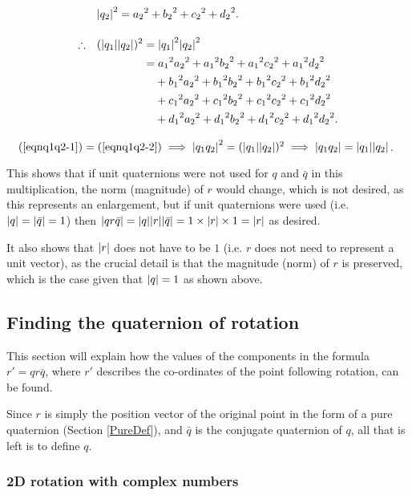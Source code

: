 \documentclass[10pt]{article}
\begin{document}
\begin{alignat}{2}
    & \abs{q_2}^2 = {a_2}^2 + {b_2}^2 + {c_2}^2 + {d_2}^2. \nonumber \\[10pt]
    \therefore \quad & (\abs{q_1}\abs{q_2})^2 = \abs{q_1}^2\abs{q_2}^2 \nonumber \\
             & \phantom{(\abs{q_1}\abs{q_2})^2} = {a_1}^2{a_2}^2 + {a_1}^2{b_2}^2 + {a_1}^2{c_2}^2 + {a_1}^2{d_2}^2 \label{eqnq1q2-2} \\
             & \phantom{(\abs{q_1}\abs{q_2})^2=} + {b_1}^2{a_2}^2 + {b_1}^2{b_2}^2 + {b_1}^2{c_2}^2 + {b_1}^2{d_2}^2 \nonumber \\
             & \phantom{(\abs{q_1}\abs{q_2})^2=} + {c_1}^2{a_2}^2 + {c_1}^2{b_2}^2 + {c_1}^2{c_2}^2 + {c_1}^2{d_2}^2 \nonumber \\
             & \phantom{(\abs{q_1}\abs{q_2})^2=} + {d_1}^2{a_2}^2 + {d_1}^2{b_2}^2 + {d_1}^2{c_2}^2 + {d_1}^2{d_2}^2. \nonumber
\end{alignat}
\endgroup

$\quad (\ref{eqnq1q2-1}) = (\ref{eqnq1q2-2}) \implies \abs{q_1q_2}^2 = (\abs{q_1}\abs{q_2})^2 \implies \abs{q_1q_2} = \abs{q_1}\abs{q_2}$.

This shows that if unit quaternions were not used for $q$ and $\bar{q}$ in this multiplication, the norm (magnitude) of $r$ would change, which is not desired, as this represents an enlargement, but if unit quaternions were used (i.e. $\abs{q} = \abs{\bar{q}} = 1$) then $\abs{qr\bar{q}} = \abs{q}\abs{r}\abs{\bar{q}} = 1\times\abs{r}\times1 = \abs{r}$ as desired.

It also shows that $\abs{r}$ does not have to be $1$ (i.e. $r$ does not need to represent a unit vector), as the crucial detail is that the magnitude (norm) of $r$ is preserved, which is the case given that $\abs{q} = 1$ as shown above.

\subsection{Finding the quaternion of rotation}

This section will explain how the values of the components in the formula $r' = qr\bar{q}$, where $r'$ describes the co-ordinates of the point following rotation, can be found.

Since $r$ is simply the position vector of the original point in the form of a pure quaternion (Section \ref{PureDef}), and $\bar{q}$ is the conjugate quaternion of $q$, all that is left is to define $q$.

\subsubsection{2D rotation with complex numbers} \label {Complex2DRotation}
\end{document}
